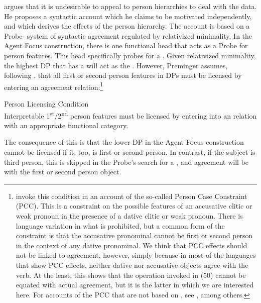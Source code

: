 \documentclass[output=paper]{langsci/langscibook}
\begin{document}
\citet{Preminger2014} argues that it is undesirable to appeal to person hierarchies to deal with the  data. He proposes a syntactic account which he claims to be motivated independently, and which derives the effects of the person hierarchy. The account is based on a Probe- system of syntactic agreement regulated by relativized minimality. In the  Agent Focus construction, there is one functional head that acts as a Probe for person features. This head specifically probes for a . Given relativized minimality, the highest DP that has a  will act as the . However, Preminger assumes, following \citet{Bejar2003}, that all first or second person features in DPs must be licensed by entering an agreement relation:\footnote{\citet{Bejar2003} invoke this condition in an account of the so-called Person Case Constraint (PCC). This is a constraint on the possible features of an accusative clitic or weak pronoun in the presence of a dative clitic or weak pronoun. There is language variation in what is prohibited, but a common form of the constraint is that the accusative pronominal cannot be first or second person in the context of any dative pronominal. We think that PCC effects should not be linked to agreement, however, simply because in most of the languages that show PCC effects, neither dative nor accusative objects agree with the verb. At the least, this shows that the  operation invoked in (50) cannot be equated with actual agreement, but it is the latter in which we are interested here. For accounts of the PCC that are not based on , see \citet{Haspelmath2004,Runić2013,Kiss2015}, among others.}

\ea \label{bkm:Ref454187927}  Person Licensing Condition \citep{Bejar2003}\\
Interpretable 1\textsuperscript{st}/2\textsuperscript{nd} person features must be licensed by entering into an  relation with an appropriate functional category.
\z

The consequence of this is that the lower DP in the Agent Focus construction cannot be licensed if it, too, is first or second person. In contrast, if the subject is third person, this is skipped in the Probe’s search for a , and agreement will be with the first or second person object.
\end{document}
